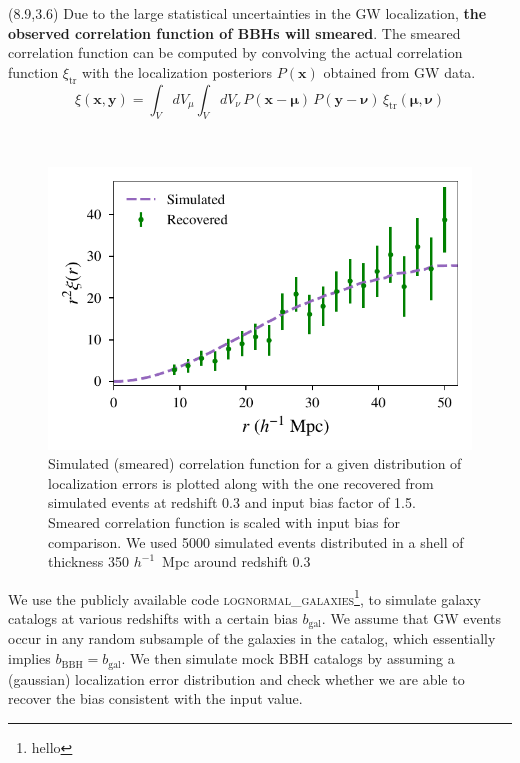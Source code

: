 \documentclass[a1,portrait]{a1poster}
\newcommand{\headingcolor}{\color{BannerElevenColor}}
\newcommand{\x}{\mathbf{x}}
\newcommand{\y}{\mathbf{y}}
\newcommand{\xit}{\xi_\mathrm{tr}}
\newcommand{\bmu}{\bm \mu}
\newcommand{\bnu}{\bm \nu}
\def\LHead#1{\noindent{\LARGE \headingcolor #1}\smallskip}
\begin{document}
\begin{textblock}{7.3}(8.9,3.6)	%
\vspace{2cm}
Due to the large statistical uncertainties in the GW localization, \textbf{the observed correlation function of BBHs will smeared}. The smeared correlation function can be computed by convolving the actual correlation function $ \xi_\mathrm{tr} $ with the localization posteriors $ P(\x) $ obtained from GW data.
\begin{equation}
\xi(\x, \y) = \int_V dV_\mu \int_V dV_\nu \,  P(\x-\bmu) \, P(\y-\bnu) \, \xit(\bmu, \bnu)
\label{eq:xi_v2}
\end{equation}

\LHead{Simulations and Results}\\
\begin{figure}[t]
	\centering
	\includegraphics[scale=1.8]{comparison_data_expected.pdf}
	\caption{\small{Simulated (smeared) correlation function for a given distribution of localization errors is plotted along with the one recovered from simulated events at redshift 0.3 and input bias factor of 1.5. Smeared correlation function is scaled with input bias for comparison. We used 5000 simulated events distributed in a shell of thickness 350 $h^{-1}$~Mpc around redshift $0.3$} }
	\label{fig:simulation_example}
\end{figure}
We use the publicly available code \textsc{lognormal\_galaxies}\footnote{hello}, to simulate galaxy catalogs at various redshifts with a certain bias $ b_\mathrm{gal} $. We assume that GW events occur in any random subsample of the galaxies in the catalog, which essentially implies $b_\mathrm{BBH}=b_\mathrm{gal}$. We then simulate mock BBH catalogs by assuming a (gaussian) localization error distribution and check whether we are able to recover the bias consistent with the input value.\\


\end{textblock}
\end{document}
